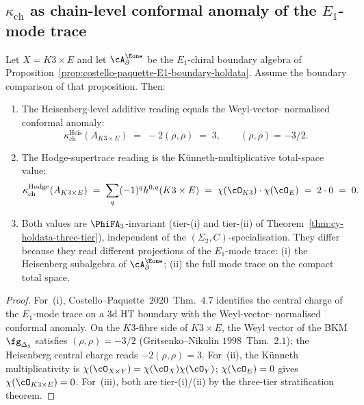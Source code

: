 \subsection{\texorpdfstring{$\kappa_{\mathrm{ch}}$}{kappa-ch} as chain-level conformal anomaly of the \texorpdfstring{$E_1$}{E-1}-mode trace}
\label{subsec:kappa-ch-as-conformal-anomaly}

\begin{proposition}
\label{prop:kappa-ch-as-E1-mode-anomaly}
Let $X = K3 \times E$ and let $\cA^{\Eone}_\partial$ be the $E_1$-chiral
boundary algebra of Proposition~\ref{prop:costello-paquette-E1-boundary-holdata}.
Assume the boundary comparison of that proposition. Then:
\begin{enumerate}[label=(\roman*)]
\item The Heisenberg-level additive reading equals the Weyl-vector-
normalised conformal anomaly:
\[
 \kappa_{\mathrm{ch}}^{\mathrm{Heis}}(A_{K3 \times E})
 \;=\;
 -2(\rho, \rho)
 \;=\;
 3,
\qquad
(\rho, \rho) = -3/2.
\]
\item The Hodge-supertrace reading is the K\"unneth-multiplicative
total-space value:
\[
 \kappa_{\mathrm{ch}}^{\mathrm{Hodge}}(A_{K3 \times E})
 \;=\;
 \sum_q (-1)^q h^{0,q}(K3 \times E)
 \;=\;
 \chi(\cO_{K3})\cdot\chi(\cO_E)
 \;=\;
 2 \cdot 0
 \;=\;
 0.
\]
\item Both values are $\PhiFA_3$-invariant (tier-\textup{(i)} and
tier-\textup{(ii)} of Theorem~\ref{thm:cy-holdata-three-tier}),
independent of the $(\Sigma_2, C)$-specialisation. They differ because
they read different projections of the $E_1$-mode trace: \textup{(i)}
the Heisenberg subalgebra of $\cA^{\Eone}_\partial$; \textup{(ii)} the
full mode trace on the compact total space.
\end{enumerate}
\end{proposition}

\begin{proof}
For~(i), Costello--Paquette~$2020$~Thm.~$4.7$ identifies the central charge
of the $E_1$-mode trace on a $3$d HT boundary with the Weyl-vector-
normalised conformal anomaly. On the $K3$-fibre side of
$K3 \times E$, the Weyl vector of the BKM $\fg_{\Delta_5}$ satisfies
$(\rho, \rho) = -3/2$ (Gritsenko--Nikulin $1998$~Thm.~$2.1$); the
Heisenberg central charge reads $-2(\rho, \rho) = 3$. For~(ii), the
K\"unneth multiplicativity is $\chi(\cO_{X \times Y}) = \chi(\cO_X)
\chi(\cO_Y)$; $\chi(\cO_E) = 0$ gives $\chi(\cO_{K3 \times E}) = 0$.
For~(iii), both are tier-\textup{(i)}/\textup{(ii)} by the three-tier
stratification theorem.
\end{proof}

